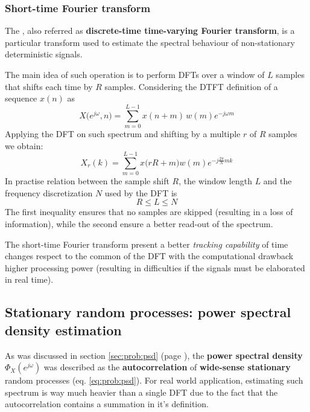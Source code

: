 		\subsubsection{Short-time Fourier transform}
		The , also referred as \textbf{discrete-time time-varying Fourier transform}, is a particular transform used to estimate the spectral behaviour of non-stationary deterministic signals.
		
		The main idea of such operation is to perform DFTs over a window of $L$ samples that shifts each time by $R$ samples. Considering the DTFT definition of a sequence $x(n)$ as
		\[ X\big(e^{j\omega}, n\big) = \sum_{m=0}^{L-1} x(n+m)\, w(m) e^{-j\omega m} \]
		Applying the DFT on such spectrum and shifting by a multiple $r$ of $R$ samples we obtain:
		\begin{equation}
			X_r(k) = \sum_{m=0}^{L-1} x\big(rR+m\big) w(m) e^{-j\frac{2\pi}{N}mk}
		\end{equation}
		In practise relation between the sample shift $R$, the window length $L$ and the frequency discretization $N$ used by the DFT is
		\[ R \leq L \leq N \]
		The first inequality ensures that no samples are skipped (resulting in a loss of information), while the second ensure a better read-out of the spectrum.
		
		The short-time Fourier transform present a better \textit{tracking capability} of time changes respect to the common of the DFT with the computational drawback higher processing power (resulting in difficulties if the signals must be elaborated in real time).
		
	\subsection{Stationary random processes: power spectral density estimation}
		As was discussed in section \ref{sec:prob:psd} (page \pageref{sec:prob:psd}), the \textbf{power spectral density} $\Phi_X(e^{j\omega})$ was described as the \textbf{autocorrelation} of \textbf{wide-sense stationary} random processes (eq. \ref{eq:prob:psd}). For real world application, estimating such spectrum is way much heavier than a single DFT due to the fact that the autocorrelation contains a summation in it's definition.
		
